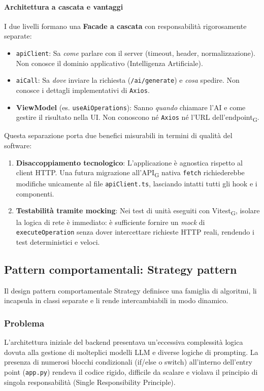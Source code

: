 \documentclass[11pt,a4paper]{article}
\newcommand{\gls}[1]{#1\textsubscript{G}}
\begin{document}
\paragraph{Architettura a cascata e vantaggi}
I due livelli formano una \textbf{Facade a cascata} con responsabilità rigorosamente separate:
\begin{itemize}
    \item \texttt{apiClient}: Sa \textit{come} parlare con il server (timeout, header, normalizzazione). Non conosce il dominio applicativo (Intelligenza Artificiale).
    \item \texttt{aiCall}: Sa \textit{dove} inviare la richiesta (\texttt{/ai/generate}) e \textit{cosa} spedire. Non conosce i dettagli implementativi di \texttt{Axios}.
    \item \textbf{ViewModel} (es. \texttt{useAiOperations}): Sanno \textit{quando} chiamare l'AI e come gestire il risultato nella UI. Non conoscono né \texttt{Axios} né l'URL dell'\gls{endpoint}.
\end{itemize}

Questa separazione porta due benefici misurabili in termini di qualità del software:
\begin{enumerate}
    \item \textbf{Disaccoppiamento tecnologico}: L'applicazione è agnostica rispetto al client HTTP. Una futura migrazione all'\gls{API} nativa \texttt{fetch} richiederebbe modifiche unicamente al file \texttt{apiClient.ts}, lasciando intatti tutti gli hook e i componenti.
    \item \textbf{Testabilità tramite mocking}: Nei test di unità eseguiti con \gls{Vitest}, isolare la logica di rete è immediato: è sufficiente fornire un \textit{mock} di \texttt{executeOperation} senza dover intercettare richieste HTTP reali, rendendo i test deterministici e veloci.
\end{enumerate}


\newpage

\subsection{Pattern comportamentali: Strategy pattern}
Il design pattern comportamentale Strategy definisce una famiglia di algoritmi, li incapsula in classi separate e li rende intercambiabili in modo dinamico.

\subsubsection{Problema}
L’architettura iniziale del backend presentava un'eccessiva complessità logica dovuta alla gestione di molteplici modelli LLM e diverse logiche di prompting. La presenza di numerosi blocchi condizionali (if/else o switch) all'interno dell'entry point (\texttt{app.py}) rendeva il codice rigido, difficile da scalare e violava il principio di singola responsabilità (Single Responsibility Principle).
\end{document}

